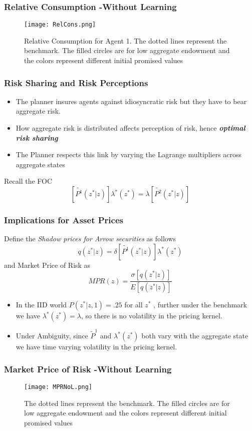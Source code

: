 \documentclass{beamer}
\theoremstyle{Definition}
\begin{document}
\begin{frame}
\frametitle{Relative Consumption -Without Learning}
 \begin{figure}
 {\texttt{[image: RelCons.png]}}
 \caption{\tiny{Relative Consumption for Agent 1. The dotted lines represent the benchmark. The filled circles are for low aggregate endowment and the colors represent different initial promised values}}
  \end{figure}
  \end{frame}
  
\begin{frame}
\frametitle{Risk Sharing and Risk Perceptions}
\begin{itemize}
	\item The planner insures agents against idiosyncratic risk but they have to bear aggregate risk.
	\item How aggregate risk is distributed affects perception of risk, hence \textbf{\emph{optimal risk sharing}}
	\item The Planner respects this link by varying the Lagrange multipliers across aggregate states 
\end{itemize}
Recall the FOC
\[\left[\tilde{P^1}(z^* |z)\right]\lambda^*(z^*)=\lambda\left[\tilde{P^2}(z^* |z)\right] \]
\end{frame}

\begin{frame}
\frametitle{Implications for Asset Prices}
Define the \emph{Shadow prices for Arrow securities} as follows
\[q(z^*|z)=\delta \left[\tilde{P^1}(z^* |z)\right]\lambda^*(z^*)\]
and Market Price of Risk as
\[MPR(z)=\frac{\sigma[q(z^*|z)]}{E[q(z^*|z)]}\]

\begin{itemize}
	\item In the IID world  $P(z^*|z,1) = .25$ for all $z^*$ , further under the benchmark we have $\lambda^*(z^*)=\lambda$, so there is no volatility in the pricing kernel.
	\item Under Ambiguity, since $\tilde{P}^1$ and $\lambda^*(z^*)$ both vary with the aggregate state we have time varying volatility in the pricing kernel.
	
\end{itemize}
\end{frame}

\begin{frame}
\frametitle{Market Price of Risk -Without Learning}
 \begin{figure}
 {\texttt{[image: MPRNoL.png]}}
 \caption{\tiny{The dotted lines represent the benchmark. The filled circles are for low aggregate endowment and the colors represent different initial promised values}}
  \end{figure}
  \end{frame}
  
\end{document}
